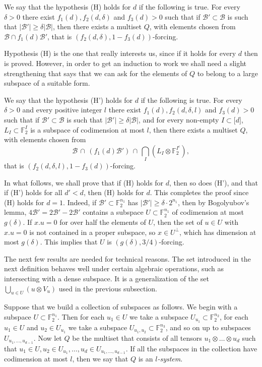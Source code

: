 \documentclass{toc}
\newcommand\F{\mathbb{F}}
\renewcommand\d{\delta}
\newcommand \cB{\mathcal B}
\newcommand \s{\subset}
\begin{document}
\begin{definition}
	We say that the hypothesis (H) holds for $d$ if the following is true. For every $\d>0$ there exist $f_1(d),f_2(d,\d)$ and $f_3(d)>0$ such that if $\cB'\subset \cB$ is such that $|\cB'|\geq \d|\cB|$, then there exists a multiset $Q$, with elements chosen from $\cB\cap f_1(d)\cB'$, that is $(f_2(d,\d),1-f_3(d))$-forcing.
\end{definition}

Hypothesis (H) is the one that really interests us, since if it holds for every $d$ then  is proved. However, in order to get an induction to work we shall need a slight strengthening that says that we can ask for the elements of $Q$ to belong to a large subspace of a suitable form.

\begin{definition}	
  We say that the hypothesis (H') holds for $d$ if the following is true. For every $\d>0$ and every positive integer $l$ there exist $f_1(d),f_2(d,\d,l)$ and $f_3(d)>0$ such that if $\cB'\subset \cB$ is such that $|\cB'|\geq \d|\cB|$, and for every non-empty $I\subset \lbrack d\rbrack$, $L_I\s \F_2^I$ is a subspace of codimension at most $l$, then there exists a multiset $Q$, with elements chosen from
  \[
    \cB\,\cap\, (f_1(d)\cB')\,\cap\, \bigcap_{I} (L_I\otimes \F_2^{I^c}),
  \]
  that is $(f_2(d,\d,l),1-f_3(d))$-forcing.
\end{definition}

In what follows, we shall prove that if (H) holds for $d$, then so does (H'), and that if (H') holds for all $d'<d$, then (H) holds for $d$. This completes the proof since (H) holds for $d=1$. Indeed, if $\cB'\s \F_2^{n_1}$ has $|\cB'|\geq \d\cdot2^{n_1}$, then by Bogolyubov's lemma, $4\cB'=2\cB'-2\cB'$ contains a subspace $U\s \F_2^{n_1}$ of codimension at most $g(\d)$. If $x.u=0$ for over half the elements of $U$, then the set of $u\in U$ with $x.u=0$ is not contained in a proper subspace, so $x\in U^\perp$, which has dimension at most $g(\d)$. This implies that $U$ is $(g(\d),3/4)$-forcing.

\medskip

The next few results are needed for technical reasons. The set introduced in the next definition behaves well under certain algebraic operations, such as intersecting with a dense subspace. It is a generalization of the set $\bigcup_{u\in U}(u\otimes V_u)$ used in the previous subsection.


\begin{definition} \label{ksystem}
	Suppose that we build a collection of subspaces as follows. We begin with a subspace $U\subset\F_2^{n_1}$. Then for each $u_1\in U$ we take a subspace $U_{u_1}\subset\F_2^{n_2}$, for each $u_1\in U$ and $u_2\in U_{u_1}$ we take a subspace $U_{u_1,u_2}\subset\F_2^{n_3}$, and so on up to subspaces $U_{u_1,\dots,u_{d-1}}$. Now let $Q$ be the multiset that consists of all tensors $u_1\otimes\dots\otimes u_d$ such that $u_1\in U, u_2\in U_{u_1},\dots,u_d\in U_{u_1,\dots,u_{d-1}}$. If all the subspaces in the collection have codimension at most $l$, then we say that $Q$ is an \emph{$l$-system}.
\end{definition}
\end{document}
